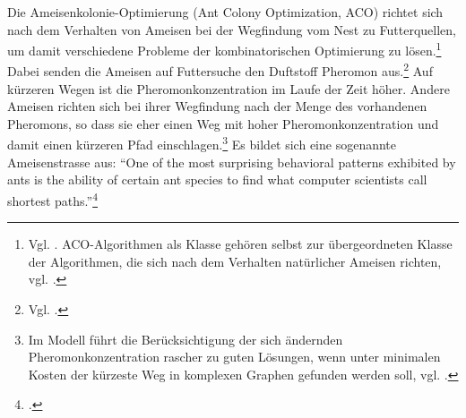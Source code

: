 Die Ameisenkolonie-Optimierung (Ant Colony Optimization, ACO) richtet sich nach
dem Verhalten von Ameisen bei der Wegfindung vom Nest zu Futterquellen, um damit
verschiedene Probleme der kombinatorischen Optimierung zu lösen.\footnote{Vgl.
\citet*[S. 1]{sch-koa}. ACO-Algorithmen als Klasse gehören selbst zur
übergeordneten Klasse der Algorithmen, die sich nach dem Verhalten natürlicher
Ameisen richten, vgl. \citet*[S. 22]{ds-ant}.} Dabei senden die Ameisen auf
Futtersuche den Duftstoff Pheromon aus.\footnote{Vgl. \citet*[S.
1\,ff.]{ds-ant}.} Auf kürzeren Wegen ist die Pheromonkonzentration im Laufe der
Zeit höher. Andere Ameisen richten sich bei ihrer Wegfindung nach der Menge des
vorhandenen Pheromons, so dass sie eher einen Weg mit hoher
Pheromonkonzentration und damit einen kürzeren Pfad einschlagen.\footnote{Im
Modell führt die Berücksichtigung der sich ändernden Pheromonkonzentration
rascher zu guten Lösungen, wenn unter minimalen Kosten der kürzeste Weg in
komplexen Graphen gefunden werden soll, vgl. \citet*[S. 9\,ff.; 22]{ds-ant}.} Es
bildet sich eine sogenannte Ameisenstrasse aus: \enquote{One of the most
surprising behavioral patterns exhibited by ants is the ability of certain ant
species to find what computer scientists call shortest
paths.}\footnote{\citet*[S. IX]{ds-ant}.}


